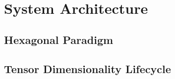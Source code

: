 \chapter{System Architecture}

\section{Hexagonal Paradigm}

\section{Tensor Dimensionality Lifecycle}
